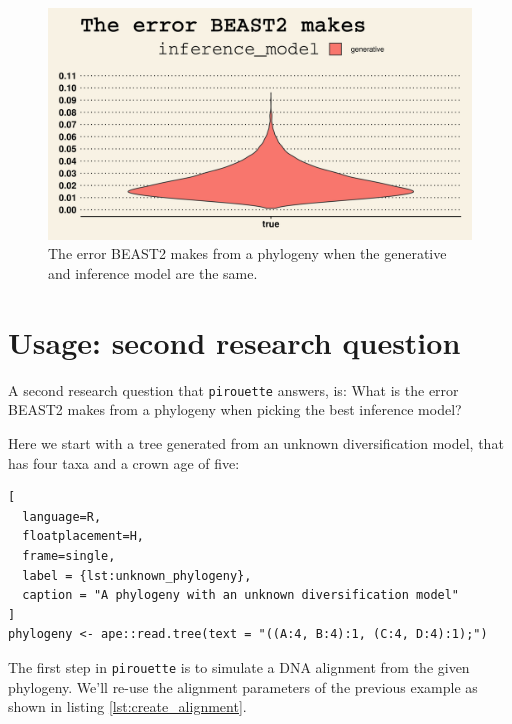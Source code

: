 \documentclass{article}
\begin{document}
\begin{figure}[h]
  \includegraphics[width=\textwidth]{figure_example_1.png}
  \caption{
    The error BEAST2 makes from a phylogeny 
    when the generative and inference model are the same.
  }
  \label{fig:example_1}
\end{figure}

\section{Usage: second research question}

A second research question that \verb;pirouette; answers, is:
What is the error BEAST2 makes from a phylogeny when
picking the best inference model?

Here we start with a tree generated from an unknown 
diversification model, that has four taxa and a crown age of five:

\begin{lstlisting}[
  language=R, 
  floatplacement=H, 
  frame=single, 
  label = {lst:unknown_phylogeny},
  caption = "A phylogeny with an unknown diversification model"
]
phylogeny <- ape::read.tree(text = "((A:4, B:4):1, (C:4, D:4):1);")
\end{lstlisting}

The first step in \verb;pirouette; is to simulate a DNA alignment from the 
given phylogeny. We'll re-use the alignment parameters of the previous example
as shown in listing \ref{lst:create_alignment}.
\end{document}
